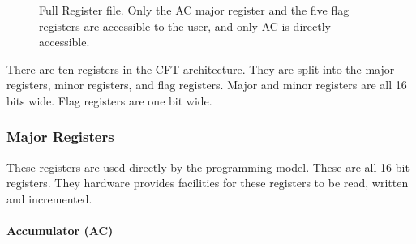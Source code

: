 \documentclass[11pt,a4paper,twocolumns]{article}
\newcommand\register[1]{\textsf{#1}}
\newcommand\A{\register{AC}}
\newcommand\Lreg{\register{L}}
\newcommand\Ireg{\register{I}}
\newcommand\Zreg{\register{Z}}
\newcommand\Vreg{\register{V}}
\newcommand\Nreg{\register{N}}
\newcommand\AR{\register{AR}}
\newcommand\DR{\register{DR}}
\newcommand\PC{\register{PC}}
\newcommand\IR{\register{IR}}
\begin{document}
\begin{figure}[tb]
  \centering

  \caption{\label{fig-rf}Full Register file. Only the \A{} major
    register and the five flag registers are accessible to the user,
    and only \A{} is directly accessible.}

\end{figure}

There are ten registers in the CFT architecture. They are split into
the major registers, minor registers, and flag registers. Major and
minor registers are all 16 bits wide. Flag registers are one bit wide.

\subsubsection{Major Registers}

These registers are used directly by the programming model. These are
all 16-bit registers. They hardware provides facilities for these
registers to be read, written and incremented.

\paragraph{Accumulator (\A)}
\end{document}
